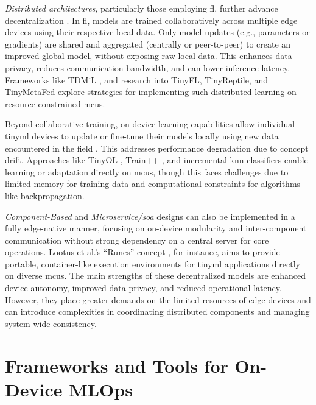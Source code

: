 \textit{Distributed architectures}, particularly those employing \gls{fl}, further advance decentralization \cite{gulatiTDMiLTinyDistributed2024, grauOnDeviceTrainingMachine2021}. In \gls{fl}, models are trained collaboratively across multiple edge devices using their respective local data. Only model updates (e.g., parameters or gradients) are shared and aggregated (centrally or peer-to-peer) to create an improved global model, without exposing raw local data. This enhances data privacy, reduces communication bandwidth, and can lower inference latency. Frameworks like TDMiL \cite{gulatiTDMiLTinyDistributed2024}, and research into TinyFL, TinyReptile, and TinyMetaFed \cite{renOndeviceOnlineLearning2024} explore strategies for implementing such distributed learning on resource-constrained \glspl{mcu}.

Beyond collaborative training, on-device learning capabilities allow individual \gls{tinyml} devices to update or fine-tune their models locally using new data encountered in the field \cite{disabatoIncrementalOnDeviceTiny2020, renOndeviceOnlineLearning2024}. This addresses performance degradation due to concept drift. Approaches like TinyOL \cite{renOndeviceOnlineLearning2024}, Train++ \cite{sudharsanEdge2TrainFrameworkTrain2020}, and incremental \gls{knn} classifiers \cite{disabatoIncrementalOnDeviceTiny2020} enable learning or adaptation directly on \glspl{mcu}, though this faces challenges due to limited memory for training data and computational constraints for algorithms like backpropagation.

\textit{Component-Based} and \textit{Microservice/\gls{soa}} designs can also be implemented in a fully edge-native manner, focusing on on-device modularity and inter-component communication without strong dependency on a central server for core operations. Lootus et al.'s ``Runes'' concept \cite{lootusVMContainerizedApproach2022}, for instance, aims to provide portable, container-like execution environments for \gls{tinyml} applications directly on diverse \glspl{mcu}. The main strengths of these decentralized models are enhanced device autonomy, improved data privacy, and reduced operational latency. However, they place greater demands on the limited resources of edge devices and can introduce complexities in coordinating distributed components and managing system-wide consistency.


\section{Frameworks and Tools for On-Device MLOps}
\label{sec:RQ2_Results_Frameworks}

